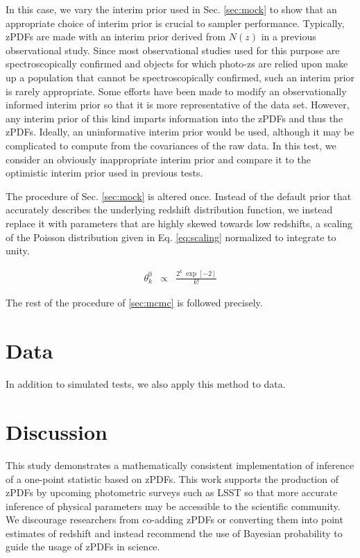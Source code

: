 \documentclass[preprint]{aastex}
\begin{document}
In this case, we vary the interim prior used in Sec. \ref{sec:mock} to show that an appropriate choice of interim prior is crucial to sampler performance.  Typically, zPDFs are made with an interim prior derived from $N(z)$ in a previous observational study.  Since most observational studies used for this purpose are spectroscopically confirmed and objects for which photo-zs are relied upon make up a population that cannot be spectroscopically confirmed, such an interim prior is rarely appropriate.  Some efforts have been made to modify an observationally informed interim prior so that it is more representative of the data set.  \citep{she11}  However, any interim prior of this kind imparts information into the zPDFs and thus the zPDFs.  Ideally, an uninformative interim prior would be used, although it may be complicated to compute from the covariances of the raw data.  In this test, we consider an obviously inappropriate interim prior and compare it to the optimistic interim prior used in previous tests.

The procedure of Sec. \ref{sec:mock} is altered once.  Instead of the default prior that accurately describes the underlying redshift distribution function, we instead replace it with parameters that are highly skewed towards low redshifts, a scaling of the Poisson distribution given in Eq. \ref{eq:scaling} normalized to integrate to unity.

\begin{eqnarray}
\label{eq:scaling}
\theta^{0}_{k} &\propto& \frac{2^{k}\ \exp[-2]}{k!}
\end{eqnarray}

The rest of the procedure of \ref{sec:mcmc} is followed precisely.

\clearpage
\section{Data}
\label{sec:data}

In addition to simulated tests, we also apply this method to data.

\clearpage
\section{Discussion}
\label{sec:disc}

This study demonstrates a mathematically consistent implementation of inference of a one-point statistic based on zPDFs.  This work supports the production of zPDFs by upcoming photometric surveys such as LSST so that more accurate inference of physical parameters may be accessible to the scientific community.  We discourage researchers from co-adding zPDFs or converting them into point estimates of redshift and instead recommend the use of Bayesian probability to guide the usage of zPDFs in science.
\end{document}
